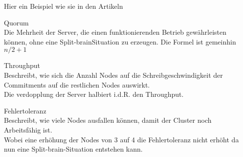 Hier ein Beispiel wie sie in den Artikeln \cite{UMIGLCCI, YDS7DTYM, V4XLXN7W}
\begin{description}
    \item Quorum\hfill \\Die Mehrheit der Server, die einen funktionierenden Betrieb gewährleisten können, ohne eine \Gls{Split-brain}Situation zu erzeugen.
    Die Formel ist gemeinhin \(n/2 + 1\)
    \item Throughput\hfill \\Beschreibt, wie sich die Anzahl Nodes auf die Schreibgeschwindigkeit der Commitments auf die restlichen Nodes auswirkt.\\Die verdopplung der Server halbiert i.d.R. den Throughput.
    \item Fehlertoleranz\hfill \\Beschreibt, wie viele Nodes ausfallen können, damit der Cluster noch Arbeitsfähig ist.\\Wobei eine erhöhung der Nodes von 3 auf 4 die Fehlertoleranz nicht erhöht da nun eine \Gls{Split-brain}-Situation entstehen kann.
\end{description}
\begin{landscape}
\begin{table}[]
\caption{Quorum Beispiele}
\label{tab:quorum-beispiele}
\end{table}
\end{landscape}
